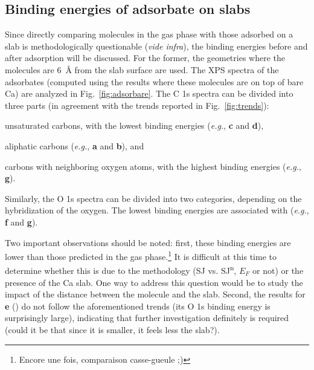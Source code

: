 \documentclass[journal=jpccck,manuscript=article]{achemso}
\begin{document}
\clearpage
\subsection{Binding energies of adsorbate on slabs}

Since directly comparing molecules in the gas phase with those adsorbed on a slab is methodologically questionable (\textit{vide infra}), the binding energies before and after adsorption will be discussed. For the former, the geometries where the molecules are \SI{6}{\angstrom} from the slab surface are used. The XPS spectra of the adsorbates (computed using the results where these molecules are on top of bare Ca) are analyzed in Fig.~\ref{fig:adsorbare}. The C 1s spectra can be divided into three parts (in agreement with the trends reported in Fig.~\ref{fig:trends}): \begin{inparaenum}[i)]
	\item unsaturated carbons, with the lowest binding energies (\textit{e.g.}, \textbf{c} and \textbf{d}),
	\item aliphatic carbons (\textit{e.g.}, \textbf{a} and \textbf{b}), and
	\item carbons with neighboring oxygen atoms, with the highest binding energies (\textit{e.g.}, \textbf{g}).
\end{inparaenum}
Similarly, the O 1s spectra can be divided into two categories, depending on the hybridization of the oxygen. The lowest binding energies are associated with  (\textit{e.g.}, \textbf{f} and \textbf{g}).

Two important observations should be noted: first, these binding energies are lower than those predicted in the gas phase.\footnote{Encore une fois, comparaison casse-gueule ;)} It is difficult at this time to determine whether this is due to the methodology (SJ vs. SJ\textsuperscript{n}, $E_F$ or not) or the presence of the Ca slab. One way to address this question would be to study the impact of the distance between the molecule and the slab. Second, the results for \textbf{e} () do not follow the aforementioned trends (its O 1s binding energy is surprisingly large), indicating that further investigation definitely is required (could it be that since it is smaller, it feels less the slab?).
\end{document}
